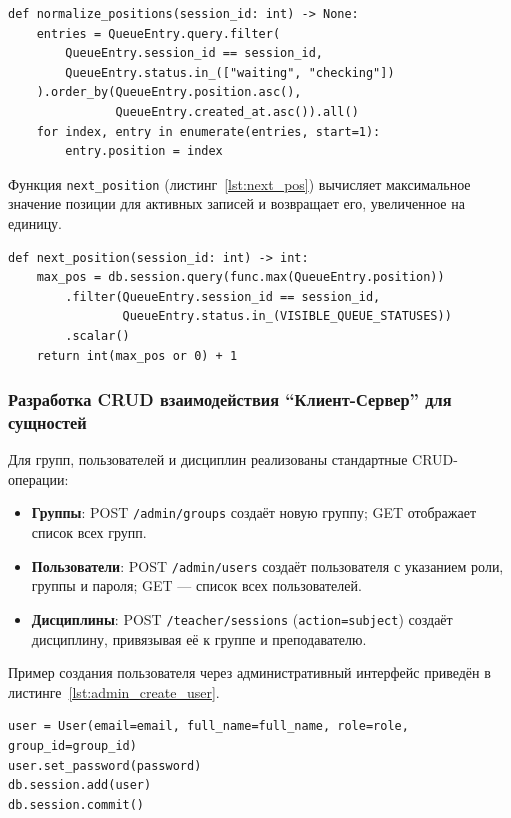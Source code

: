 \begin{lstlisting}[caption={Пересчёт позиций в очереди}, label={lst:normalize}]
def normalize_positions(session_id: int) -> None:
    entries = QueueEntry.query.filter(
        QueueEntry.session_id == session_id,
        QueueEntry.status.in_(["waiting", "checking"])
    ).order_by(QueueEntry.position.asc(),
               QueueEntry.created_at.asc()).all()
    for index, entry in enumerate(entries, start=1):
        entry.position = index
\end{lstlisting}

Функция \texttt{next\_position} (листинг~\ref{lst:next_pos}) вычисляет максимальное значение позиции для активных записей и возвращает его, увеличенное на единицу.

\begin{lstlisting}[caption={Вычисление следующей позиции}, label={lst:next_pos}]
def next_position(session_id: int) -> int:
    max_pos = db.session.query(func.max(QueueEntry.position))
        .filter(QueueEntry.session_id == session_id,
                QueueEntry.status.in_(VISIBLE_QUEUE_STATUSES))
        .scalar()
    return int(max_pos or 0) + 1
\end{lstlisting}

\subsubsection{Разработка CRUD взаимодействия ``Клиент-Сервер'' для сущностей}

Для групп, пользователей и дисциплин реализованы стандартные CRUD-операции:

\begin{itemize}
    \item \textbf{Группы}: POST \texttt{/admin/groups} создаёт новую группу; GET отображает список всех групп.
    \item \textbf{Пользователи}: POST \texttt{/admin/users} создаёт пользователя с указанием роли, группы и пароля; GET — список всех пользователей.
    \item \textbf{Дисциплины}: POST \texttt{/teacher/sessions} (\texttt{action=subject}) создаёт дисциплину, привязывая её к группе и преподавателю.
\end{itemize}

Пример создания пользователя через административный интерфейс приведён в листинге~\ref{lst:admin_create_user}.

\begin{lstlisting}[caption={Создание пользователя администратором (main.py)}, label={lst:admin_create_user}]
user = User(email=email, full_name=full_name, role=role, group_id=group_id)
user.set_password(password)
db.session.add(user)
db.session.commit()
\end{lstlisting}

